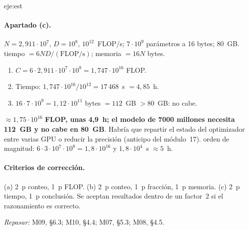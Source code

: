 \begin{solucion}{eje:est}
\paragraph{Apartado (c).}
\datos $N=2{,}911\cdot 10^{7}$, $D=10^{8}$, $10^{12}$~FLOP/s; $7\cdot 10^{9}$ parámetros a 16 bytes; 80~GB.
\planteamiento tiempo $=6ND/(\text{FLOP/s})$; memoria $=16N$ bytes.
\pasos
\begin{enumerate}[label=\arabic*.]
  \item $C=6\cdot 2{,}911\cdot 10^{7}\cdot 10^{8}=1{,}747\cdot 10^{16}$ FLOP.
  \item Tiempo: $1{,}747\cdot 10^{16}/10^{12}=17\,468$~s $=4{,}85$~h.
  \item $16\cdot 7\cdot 10^{9}=1{,}12\cdot 10^{11}$ bytes $=112$~GB $>80$~GB: no cabe.
\end{enumerate}
\resultado $\approx 1{,}75\cdot 10^{16}$ \textbf{FLOP, unas 4,9~h; el modelo de 7000 millones necesita 112~GB y no cabe en 80~GB}. Habría que repartir el estado del optimizador entre varias GPU o reducir la precisión (anticipo del módulo~17).
\comprobacion orden de magnitud: $6\cdot 3\cdot 10^{7}\cdot 10^{8}=1{,}8\cdot 10^{16}$ y $1{,}8\cdot 10^{4}$~s $\approx 5$~h.

\paragraph{Criterios de corrección.} (a) 2~p conteo, 1~p FLOP. (b) 2~p conteo, 1~p fracción, 1~p memoria. (c) 2~p tiempo, 1~p conclusión. Se aceptan resultados dentro de un factor~2 si el razonamiento es correcto.

\textit{Repasar:} M09, §6.3; M10, §4.4; M07, §5.3; M08, §4.5.
\end{solucion}
